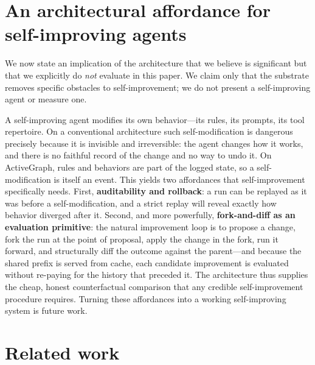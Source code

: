 \documentclass[11pt]{article}
\begin{document}
\section{An architectural affordance for self-improving agents}
\label{sec:selfimprove}

We now state an implication of the architecture that we believe is significant but
that we explicitly do \emph{not} evaluate in this paper. We claim only that the
substrate removes specific obstacles to self-improvement; we do not present a
self-improving agent or measure one.

A self-improving agent modifies its own behavior---its rules, its prompts, its
tool repertoire. On a conventional architecture such self-modification is
dangerous precisely because it is invisible and irreversible: the agent changes
how it works, and there is no faithful record of the change and no way to undo it.
On ActiveGraph, rules and behaviors are part of the logged state, so a
self-modification is itself an event. This yields two affordances that
self-improvement specifically needs. First, \textbf{auditability and rollback}: a
run can be replayed as it was before a self-modification, and a strict replay will
reveal exactly how behavior diverged after it. Second, and more powerfully,
\textbf{fork-and-diff as an evaluation primitive}: the natural improvement loop is
to propose a change, fork the run at the point of proposal, apply the change in the
fork, run it forward, and structurally diff the outcome against the parent---and
because the shared prefix is served from cache, each candidate improvement is
evaluated without re-paying for the history that preceded it. The architecture thus
supplies the cheap, honest counterfactual comparison that any credible
self-improvement procedure requires. Turning these affordances into a working
self-improving system is future work.

\section{Related work}
\label{sec:related}
\end{document}
